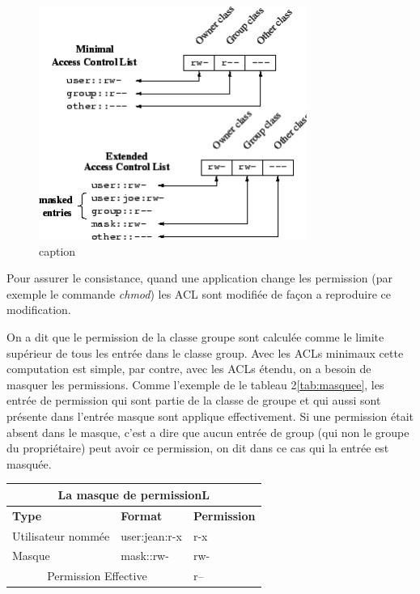 \begin{figure}[htbp]
	\centering
		\includegraphics[height=3in]{img/acl-mapping.jpg}
	\caption{caption}
	\label{fig:img_acl-mapping}
\end{figure}


Pour assurer le consistance, quand une application change les permission (par exemple le commande \emph{chmod}) les ACL sont modifiée de façon a reproduire ce modification. 

On a dit que le permission de la classe groupe sont calculée comme le limite supérieur de tous les entrée dans le classe group. Avec les ACLs minimaux cette computation est simple, par contre, avec les ACLs étendu, on a besoin de masquer les permissions. Comme l'exemple de le tableau 2\ref{tab:masquee}, les entrée de permission qui sont partie de la classe de groupe et qui aussi sont présente dans l'entrée masque sont applique effectivement. Si une permission était absent dans le masque, c'est a dire que aucun entrée de group (qui non le groupe du propriétaire) peut avoir ce permission, on dit dans ce cas qui la entrée est masquée.  

\begin{center}
\begin{tabular}{|l|l|l|}
  \hline
    \multicolumn{3}{|c|}{La masque de permissionL} \\
  \hline
	\textbf{Type} & \textbf{Format} & \textbf{Permission} \\
  \hline
	Utilisateur nommée & user:jean:r-x  & r-x\\
  \hline
	Masque & mask::rw- & rw-\\
  \hline
	\multicolumn{2}{|c|}{Permission Effective} & r--\\
  \hline
\end{tabular}
\label{tab:masque}
\end{center}

